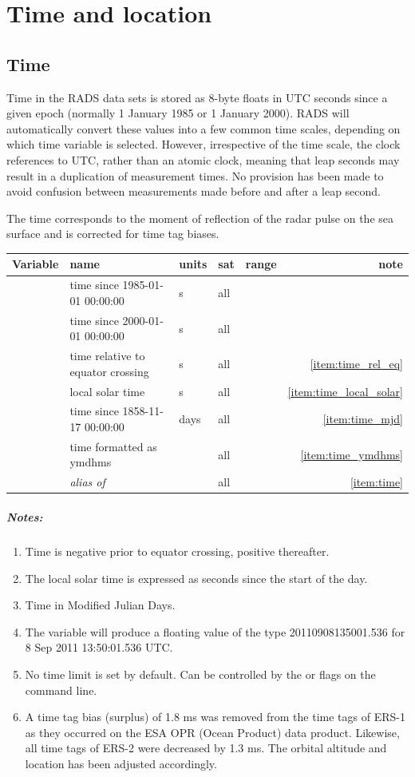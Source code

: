 \documentclass[a4paper,11pt,openany,natbib,nomargin]{thesis}
\newcommand\alias[1]{\emph{alias of} \var{#1}}
\newenvironment{vartable}{
\begin{table}[ht]
\small
\begin{tabular}{lllllr}
\hline\hline
Variable & name & units & sat & range & note \\
\hline\hline
}{
\hline
\end{tabular}
\end{table}
}
\newenvironment{notes}[1][Notes:]{\FloatBarrier\paragraph{#1}\begin{enumerate}}{\end{enumerate}}
\begin{document}
\chapter{Time and location}
\label{ch:time and location}

\section{Time}
\label{var:time}
Time in the RADS data sets is stored as 8-byte floats in UTC seconds since a given epoch (normally 1 January 1985 or 1 January 2000). RADS will automatically convert these values into a few common time scales, depending on which time variable is selected.
However, irrespective of the time scale, the clock references to UTC, rather than an atomic clock, meaning that leap seconds may result in a duplication of measurement times. No provision has been made to avoid confusion between measurements made before and after a leap second.

The time corresponds to the moment of reflection of the radar pulse on the sea surface and is corrected for time tag biases.

\begin{vartable}
\var{time_1985} & time since 1985-01-01 00:00:00 & s & all & & \\
\var{time_2000} & time since 2000-01-01 00:00:00 & s & all & & \\
\var{time_rel_eq} & time relative to equator crossing & s & all & & \ref{item:time_rel_eq} \\
\var{time_local_solar} & local solar time & s & all & & \ref{item:time_local_solar} \\
\var{time_mjd} & time since 1858-11-17 00:00:00 & days & all & & \ref{item:time_mjd} \\
\var{time_ymdhms} & time formatted as ymdhms &  & all & & \ref{item:time_ymdhms} \\
\hline
\var{time} & \alias{time_1985} & & all & & \ref{item:time} \\
\end{vartable}

\begin{notes}
\item Time is negative prior to equator crossing, positive thereafter.\label{item:time_rel_eq}
\item The local solar time is expressed as seconds since the start of the day.\label{item:time_local_solar}
\item Time in Modified Julian Days.\label{item:time_mjd}
\item The variable  will produce a floating value of the type 20110908135001.536 for 8 Sep 2011 13:50:01.536 UTC.\label{item:time_ymdhms}
\item No time limit is set by default. Can be controlled by the  or  flags on the command line.\label{item:time}
\item A time tag bias (surplus) of 1.8 ms was removed from the time tags of ERS-1 as they occurred on the ESA OPR (Ocean Product) data product. Likewise, all time tags of ERS-2 were decreased by 1.3 ms. The orbital altitude and location has been adjusted accordingly.
\end{notes}
\end{document}
